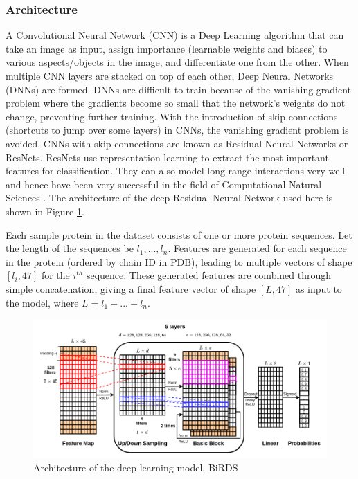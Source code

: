 \documentclass[journal=jacsat,manuscript=article]{achemso}
\begin{document}
\subsubsection{Architecture}
\quad A Convolutional Neural Network (CNN) is a Deep Learning algorithm that can take an image as input, assign importance (learnable weights and biases) to various aspects/objects in the image, and differentiate one from the other. When multiple CNN layers are stacked on top of each other, Deep Neural Networks (DNNs) are formed. DNNs are difficult to train because of the vanishing gradient problem where the gradients become so small that the network's weights do not change, preventing further training. With the introduction of skip connections (shortcuts to jump over some layers) in CNNs, the vanishing gradient problem is avoided. CNNs with skip connections are known as Residual Neural Networks or ResNets\cite{he2016deep}. ResNets use representation learning to extract the most important features for classification. They can also model long-range interactions very well and hence have been very successful in the field of Computational Natural Sciences \cite{senior2020improved}.  The architecture of the deep Residual Neural Network used here is shown in Figure \ref{fig:architecture}.

Each sample protein in the dataset consists of one or more protein sequences. Let the length of the sequences be $l_1, ..., l_n$. Features are generated for each sequence in the protein (ordered by chain ID in PDB), leading to multiple vectors of shape $[l_i, 47]$ for the $i^{th}$ sequence. These generated features are combined through simple concatenation, giving a final feature vector of shape $[L, 47]$ as input to the model, where $L = l_1 + ... + l_n$.

\begin{figure}
    \centering
    \noindent\includegraphics[scale=0.5]{architecture}
    \caption{\centering Architecture of the deep learning model, BiRDS}
    \label{fig:architecture}
\end{figure}
\end{document}
